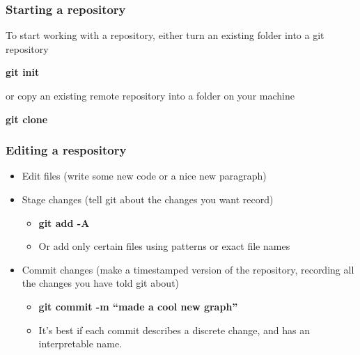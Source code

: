 \documentclass{beamer}
\newcommand{\code}[1]{{\fontfamily{pcr}\selectfont \textbf{#1}}}
\begin{document}


\begin{frame}
\frametitle{Starting a repository}

To start working with a repository, either turn an existing folder into a git repository

\medskip

\code{git init}

\medskip

or copy an existing remote repository into a folder on your machine

\medskip

\code{git clone}

\end{frame}

\begin{frame}
	\frametitle{Editing a respository}
	
	\begin{itemize}
		\item<1-> Edit files (write some new code or a nice new paragraph)
		
\par\noindent\hrulefill\par
		
		\item<2-> Stage changes (tell git about the changes you want record)
		
		\begin{itemize}
			\item \code{git add -A}
			\item Or add only certain files using patterns or exact file names
		\end{itemize}
		
		\par\noindent\hrulefill\par
		
		\item<3-> Commit changes (make a timestamped version of the repository, recording all the changes you have told git about)
		\begin{itemize}
			\item \code{git commit -m ``made a cool new graph''}
			\item It's best if each commit describes a discrete change, and has an interpretable name.
		\end{itemize}
		
		\par\noindent\hrulefill\par
	\end{itemize}
	
	
\end{frame}
\end{document}
